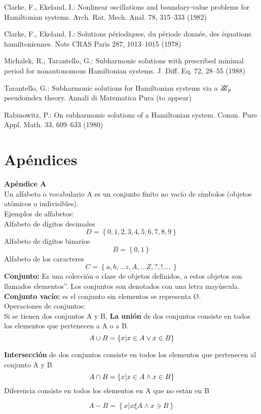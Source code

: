 \documentclass{llncs}
\begin{document}
%

%
\begin{thebibliography}{5}
%
Clarke, F., Ekeland, I.:
Nonlinear oscillations and
boundary-value problems for Hamiltonian systems.
Arch. Rat. Mech. Anal. 78, 315--333 (1982)

Clarke, F., Ekeland, I.:
Solutions p\'{e}riodiques, du
p\'{e}riode donn\'{e}e, des \'{e}quations hamiltoniennes.
Note CRAS Paris 287, 1013--1015 (1978)

Michalek, R., Tarantello, G.:
Subharmonic solutions with prescribed minimal
period for nonautonomous Hamiltonian systems.
J. Diff. Eq. 72, 28--55 (1988)

Tarantello, G.:
Subharmonic solutions for Hamiltonian
systems via a $\bbbz_{p}$ pseudoindex theory.
Annali di Matematica Pura (to appear)

Rabinowitz, P.:
On subharmonic solutions of a Hamiltonian system.
Comm. Pure Appl. Math. 33, 609--633 (1980)

\end{thebibliography}

\section{Apéndices}
\textbf{Apéndice  A} \\
Un alfabeto o vocabulario A es un conjunto finito no vacío de símbolos (objetos atómicos o indivisibles).\\
 Ejemplos de alfabetos:\\
Alfabeto de dígitos decimales
\[
D=
\left\lbrace
0,1,2,3,4,5,6,7,8,9
\right\rbrace
\]
Alfabeto de dígitos binarios
\[
B=
\left\lbrace
0,1
\right\rbrace
\]
Alfabeto de los caracteres 
\[
C=
\left\lbrace
a, b,...z, A,...Z, ?,!..., 
\right\rbrace
\]
\textbf{Conjunto:} Es una colección o clase de objetos definidos, a estos objetos son llamados elementos”. Los conjuntos son denotados con una letra mayúscula.\\
\textbf{Conjunto vacío:} es el conjunto sin elementos se representa Ø.\\
Operaciones de conjuntos:\\
Si se tienen dos conjuntos A y B, \textbf{La unión} de dos conjuntos consiste en todos los elementos que pertenecen a A o a B.
\[
A \cup B =
\left\lbrace
 x | x \in A \bigskip    \vee  x \in B 
\right\rbrace
\]

 \textbf{Intersección} de dos conjuntos  consiste en todos los elementos que pertenecen al conjunto A y B
\[
A \cap B =
\left\lbrace
 x | x \in A \bigskip  \wedge    x \in B 
\right\rbrace
\]
Diferencia consiste en todos los elementos en A que no están en B

\[
A-B  =
\left\lbrace
 x | x \xi A   \wedge  x \ni B 
\right\rbrace
\]
\end{document}
